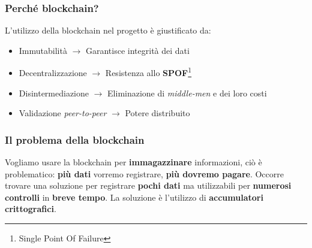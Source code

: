 \documentclass{beamer}
\begin{document}
\begin{frame}
	\frametitle{Perché blockchain?}
	L'utilizzo della blockchain nel progetto è giustificato da:
	\begin{itemize}[<+->]
		\item Immutabilità \(\rightarrow\) Garantisce integrità dei dati
		\item Decentralizzazione \(\rightarrow\) Resistenza allo \textbf{SPOF}\footnote{Single Point Of Failure}
		\item Disintermediazione \(\rightarrow\) Eliminazione di \emph{middle-men} e dei loro costi
		\item Validazione \emph{peer-to-peer} \(\rightarrow\) Potere distribuito
	\end{itemize}
\end{frame}

\begin{frame}
	\frametitle{Il problema della blockchain}
	Vogliamo usare la blockchain per
	\textbf{immagazzinare} informazioni,
	ciò è problematico: \textbf{più dati} vorremo registrare, \textbf{più
	dovremo pagare}.
	Occorre trovare una soluzione per registrare \textbf{pochi dati}
	ma utilizzabili per \textbf{numerosi controlli} in 
	\textbf{breve tempo}.
	La soluzione è l'utilizzo di \textbf{accumulatori crittografici}.
\end{frame}
\end{document}
